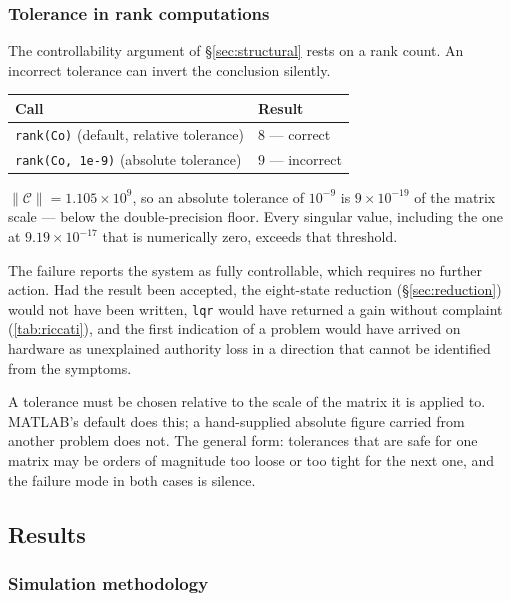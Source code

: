\subsubsection{Tolerance in rank computations}
\label{sec:rank-tolerance}

The controllability argument of \S\ref{sec:structural} rests on a rank count.
An incorrect tolerance can invert the conclusion silently.

\begin{table}[htbp]
\centering
\small
\begin{tabular}{@{}ll@{}}
\toprule
\textbf{Call} & \textbf{Result}\\
\midrule
\texttt{rank(Co)} (default, relative tolerance) & $8$ --- correct\\
\texttt{rank(Co, 1e-9)} (absolute tolerance) & $9$ --- incorrect\\
\bottomrule
\end{tabular}
\end{table}

\noindent
$\lVert\mathcal{C}\rVert = 1.105\times10^{9}$, so an absolute tolerance of
$10^{-9}$ is $9\times10^{-19}$ of the matrix scale --- below the
double-precision floor. Every singular value, including the one at
$9.19\times10^{-17}$ that is numerically zero, exceeds that threshold.

The failure reports the system as fully controllable, which requires no
further action. Had the result been accepted, the eight-state reduction
(\S\ref{sec:reduction}) would not have been written, \texttt{lqr} would have
returned a gain without complaint (\cref{tab:riccati}), and the first
indication of a problem would have arrived on hardware as unexplained
authority loss in a direction that cannot be identified from the symptoms.

A tolerance must be chosen relative to the scale of the matrix it is applied
to. MATLAB's default does this; a hand-supplied absolute figure carried from
another problem does not. The general form: tolerances that are safe for one
matrix may be orders of magnitude too loose or too tight for the next one,
and the failure mode in both cases is silence.

\subsection{Results}
\label{sec:results}

\subsubsection{Simulation methodology}
\label{sec:sim-method}


